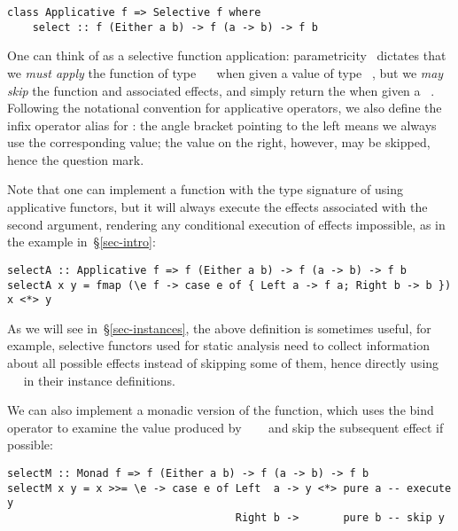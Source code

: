\vspace{1mm}
\begin{verbatim}
class Applicative f => Selective f where
    select :: f (Either a b) -> f (a -> b) -> f b
\end{verbatim}
\vspace{1mm}

\noindent
One can think of  as a selective function application:
parametricity~\citep{wadler1989theorems} dictates that we \emph{must apply} the
function of type ~\hs{->}~ when given a value of type
~, but we \emph{may skip} the function and associated effects,
and simply return the  when given a ~. Following the
notational convention for applicative operators, we also define the infix
operator alias  for : the angle bracket pointing to the left
means we always use the corresponding value; the value on the right, however,
may be skipped, hence the question mark.

Note that one can implement a function with the type signature of 
using applicative functors, but it will always execute the effects associated
with the second argument, rendering any conditional execution of effects
impossible, as in the  example in~\S\ref{sec-intro}:

\vspace{1mm}
\begin{verbatim}
selectA :: Applicative f => f (Either a b) -> f (a -> b) -> f b
selectA x y = fmap (\e f -> case e of { Left a -> f a; Right b -> b }) x <*> y
\end{verbatim}
\vspace{1mm}

\noindent
As we will see in~\S\ref{sec-instances}, the above definition is sometimes
useful, for example, selective functors used for static analysis need to collect
information about all possible effects instead of skipping some of them,
hence directly using ~\hs{=}~ in their 
instance definitions.

We can also implement a monadic version of the  function, which uses
the bind operator to examine the value produced by
~~~ and skip the subsequent effect if possible:

\vspace{1mm}
\begin{verbatim}
selectM :: Monad f => f (Either a b) -> f (a -> b) -> f b
selectM x y = x >>= \e -> case e of Left  a -> y <*> pure a -- execute y
                                    Right b ->       pure b -- skip y
\end{verbatim}
\vspace{1mm}

